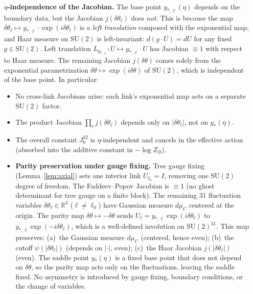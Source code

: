 \documentclass[11pt]{article}
\theoremstyle{definition}
\newcommand{\SU}{\mathrm{SU}}
\newcommand{\R}{\mathbb{R}}
\begin{document}
\textbf{$\eta$-independence of the Jacobian.}
The base point $y_{*,\ell}(\eta)$ depends on the boundary data,
but the Jacobian $j(\delta\theta_\ell)$ does \emph{not}.
This is because the map $\delta\theta_\ell\mapsto
y_{*,\ell}\cdot\exp(i\delta\theta_\ell)$ is a \emph{left
translation} composed with the exponential map, and Haar measure
on $\SU(2)$ is left-invariant:
$d(g\cdot U)=dU$ for any fixed $g\in\SU(2)$.
Left translation $L_{y_{*,\ell}}:U\mapsto y_{*,\ell}\cdot U$
has Jacobian $\equiv 1$ with respect to Haar measure.
The remaining Jacobian $j(\delta\theta)$ comes solely from
the exponential parametrization $\delta\theta\mapsto
\exp(i\delta\theta)$ of $\SU(2)$, which is independent of the
base point.  In particular:
\begin{itemize}[nosep]
\item No cross-link Jacobians arise: each link's exponential
map acts on a separate $\SU(2)$ factor.
\item The product Jacobian $\prod_\ell j(\delta\theta_\ell)$
depends only on $|\delta\theta_\ell|$, not on $y_*(\eta)$.
\item The overall constant $J_0^{32}$
is $\eta$-independent and cancels in the effective action (absorbed
into the additive constant in $-\log Z_B$).
\item \textbf{Parity preservation under gauge fixing.}
Tree gauge fixing (Lemma~\ref{lem:axial}) sets one interior link
$U_{\ell_0}=I$, removing one $\SU(2)$ degree of freedom.
The Faddeev--Popov Jacobian is $\equiv 1$ (no ghost determinant
for tree gauge on a finite block).
The remaining 31 fluctuation variables
$\delta\theta_\ell\in\R^3$ ($\ell\ne\ell_0$) have
Gaussian measure $d\mu_C$ centered at the origin.
The parity map $\delta\theta\mapsto-\delta\theta$ sends
$U_\ell=y_{*,\ell}\exp(i\delta\theta_\ell)$ to
$y_{*,\ell}\exp(-i\delta\theta_\ell)$, which is a
well-defined involution on $\SU(2)^{31}$.
This map preserves: (a)~the Gaussian measure $d\mu_C$
(centered, hence even); (b)~the cutoff
$\psi(|\delta\theta_\ell|)$ (depends on $|\cdot|$, even);
(c)~the Haar Jacobian $j(|\delta\theta_\ell|)$ (even).
The saddle point $y_*(\eta)$ is a fixed base point that
does not depend on $\delta\theta$, so the parity map
acts only on the fluctuations, leaving the saddle fixed.
No asymmetry is introduced by gauge fixing, boundary
conditions, or the change of variables.
\end{itemize}
\end{document}

